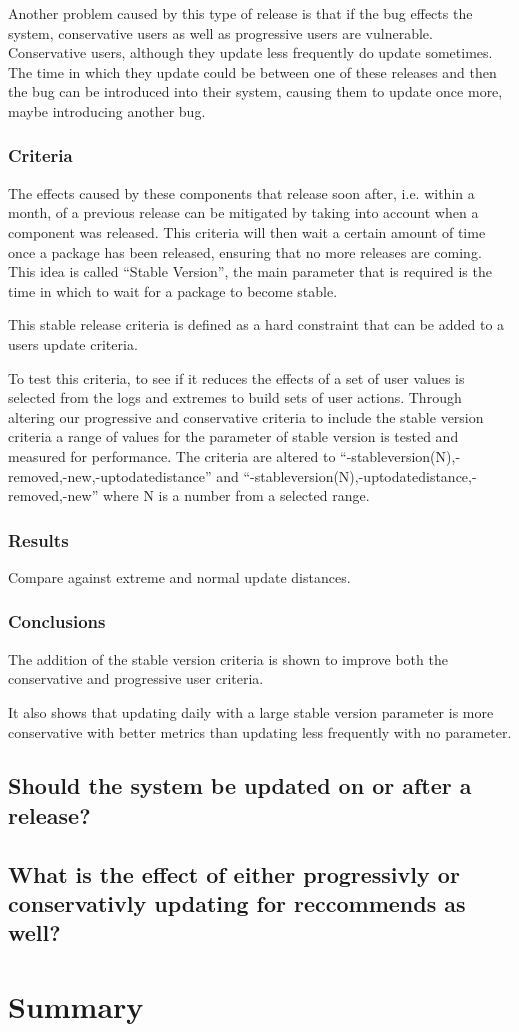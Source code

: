 Another problem caused by this type of release is that if the bug effects the system, conservative users as well as progressive users are vulnerable.
Conservative users, although they update less frequently do update sometimes.
The time in which they update could be between one of these releases and then the bug can be introduced into their system, 
causing them to update once more, maybe introducing another bug.


\subsubsection{Criteria}   
The effects caused by these components that release soon after, i.e. within a month, of a previous release can be mitigated by taking into account when a component was released.
This criteria will then wait a certain amount of time once a package has been released, ensuring that no more releases are coming.
This idea is called ``Stable Version'', the main parameter that is required is the time in which to wait for a package to become stable.

This stable release criteria is defined as a hard constraint that can be added to a users update criteria.

To test this criteria, to see if it reduces the effects of a set of user values is selected from the logs and extremes to build sets of user actions.
Through altering our progressive and conservative criteria to include the stable version criteria a range of values for the parameter of stable version is tested and measured for performance.
The criteria are altered to ``-stableversion(N),-removed,-new,-uptodatedistance'' and ``-stableversion(N),-uptodatedistance,-removed,-new'' where N is a number from a selected range.

\subsubsection{Results}
Compare against extreme and normal update distances.

\subsubsection{Conclusions}
The addition of the stable version criteria is shown to improve both the conservative and progressive user criteria.

It also shows that updating daily with a large stable version parameter is more conservative with better metrics than updating less frequently with no parameter.

\subsection{Should the system be updated on or after a release?}




\subsection{What is the effect of either progressivly or conservativly updating for reccommends as well?}


\section{Summary}

